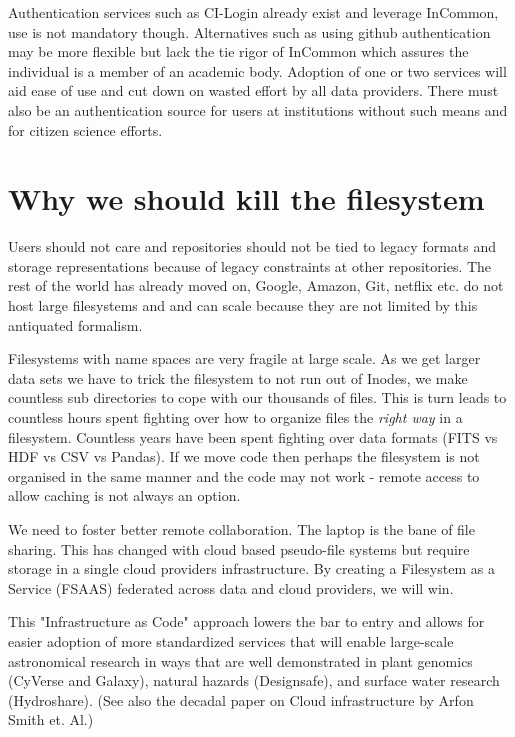 Authentication services such as CI-Login already exist and leverage InCommon, use is not mandatory though. Alternatives such as using github authentication may be more flexible but lack the tie rigor of InCommon which assures the individual is a member of an academic body.
Adoption of one or two services will  aid ease of use and cut down on wasted effort by all data providers.
There must also be an authentication source for users at institutions without such means and for citizen science efforts.

\section{Why we should kill the filesystem}

Users should not care and repositories should not be tied to legacy formats  and storage representations because of legacy constraints  at other repositories.
The rest of the world has already moved on,  Google, Amazon, Git, netflix etc. do not host large filesystems and and can scale because they are not limited by this antiquated formalism.


Filesystems with name spaces are very fragile at large scale. As we get larger data sets we have to trick the filesystem to not run out of Inodes, we make countless sub directories to cope with our thousands of files.
This is turn leads to countless hours spent fighting over how to organize files  the \emph{right way} in a filesystem.
Countless years have been spent fighting over data formats (\gls{FITS} vs \gls{HDF} vs \gls{CSV} vs Pandas).
If we move code then perhaps the filesystem is not organised in the same manner and the code may not work - remote access to allow caching is not always an option.

We need to foster better remote collaboration.  The laptop is the bane of file sharing.
This has changed with cloud based pseudo-file systems but require storage in a single
cloud providers infrastructure. By creating a Filesystem as a Service (\gls{FSAAS}) federated
across data and cloud providers, we will win.


This "Infrastructure as Code" \citep{morris2016infrastructure} approach lowers the bar to entry
and allows for easier adoption of more standardized services that will enable large-scale
astronomical research in ways that are well demonstrated in plant genomics (CyVerse and Galaxy), natural hazards (Designsafe), and surface water research (Hydroshare). (See also the decadal paper on Cloud infrastructure by Arfon Smith et. Al.)


